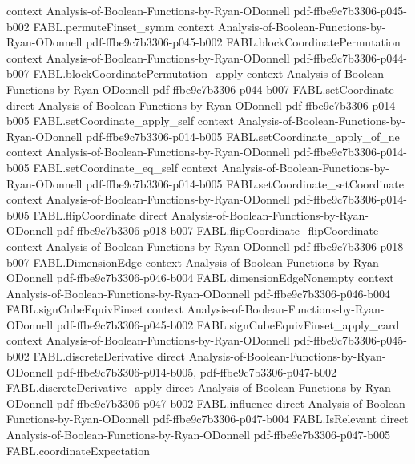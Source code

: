 \begin{theorem}
  {context}
  {Analysis-of-Boolean-Functions-by-Ryan-ODonnell}
  {pdf-ffbe9c7b3306-p045-b002}
\proofstep
  {FABL.permuteFinset_symm}
  {context}
  {Analysis-of-Boolean-Functions-by-Ryan-ODonnell}
  {pdf-ffbe9c7b3306-p045-b002}
\proofstep
  {FABL.blockCoordinatePermutation}
  {context}
  {Analysis-of-Boolean-Functions-by-Ryan-ODonnell}
  {pdf-ffbe9c7b3306-p044-b007}
\proofstep
  {FABL.blockCoordinatePermutation_apply}
  {context}
  {Analysis-of-Boolean-Functions-by-Ryan-ODonnell}
  {pdf-ffbe9c7b3306-p044-b007}
\proofstep
  {FABL.setCoordinate}
  {direct}
  {Analysis-of-Boolean-Functions-by-Ryan-ODonnell}
  {pdf-ffbe9c7b3306-p014-b005}
\proofstep
  {FABL.setCoordinate_apply_self}
  {context}
  {Analysis-of-Boolean-Functions-by-Ryan-ODonnell}
  {pdf-ffbe9c7b3306-p014-b005}
\proofstep
  {FABL.setCoordinate_apply_of_ne}
  {context}
  {Analysis-of-Boolean-Functions-by-Ryan-ODonnell}
  {pdf-ffbe9c7b3306-p014-b005}
\proofstep
  {FABL.setCoordinate_eq_self}
  {context}
  {Analysis-of-Boolean-Functions-by-Ryan-ODonnell}
  {pdf-ffbe9c7b3306-p014-b005}
\proofstep
  {FABL.setCoordinate_setCoordinate}
  {context}
  {Analysis-of-Boolean-Functions-by-Ryan-ODonnell}
  {pdf-ffbe9c7b3306-p014-b005}
\proofstep
  {FABL.flipCoordinate}
  {direct}
  {Analysis-of-Boolean-Functions-by-Ryan-ODonnell}
  {pdf-ffbe9c7b3306-p018-b007}
\proofstep
  {FABL.flipCoordinate_flipCoordinate}
  {context}
  {Analysis-of-Boolean-Functions-by-Ryan-ODonnell}
  {pdf-ffbe9c7b3306-p018-b007}
\proofstep
  {FABL.DimensionEdge}
  {context}
  {Analysis-of-Boolean-Functions-by-Ryan-ODonnell}
  {pdf-ffbe9c7b3306-p046-b004}
\proofstep
  {FABL.dimensionEdgeNonempty}
  {context}
  {Analysis-of-Boolean-Functions-by-Ryan-ODonnell}
  {pdf-ffbe9c7b3306-p046-b004}
\proofstep
  {FABL.signCubeEquivFinset}
  {context}
  {Analysis-of-Boolean-Functions-by-Ryan-ODonnell}
  {pdf-ffbe9c7b3306-p045-b002}
\proofstep
  {FABL.signCubeEquivFinset_apply_card}
  {context}
  {Analysis-of-Boolean-Functions-by-Ryan-ODonnell}
  {pdf-ffbe9c7b3306-p045-b002}
\proofstep
  {FABL.discreteDerivative}
  {direct}
  {Analysis-of-Boolean-Functions-by-Ryan-ODonnell}
  {pdf-ffbe9c7b3306-p014-b005,
    pdf-ffbe9c7b3306-p047-b002}
\proofstep
  {FABL.discreteDerivative_apply}
  {direct}
  {Analysis-of-Boolean-Functions-by-Ryan-ODonnell}
  {pdf-ffbe9c7b3306-p047-b002}
\proofstep
  {FABL.influence}
  {direct}
  {Analysis-of-Boolean-Functions-by-Ryan-ODonnell}
  {pdf-ffbe9c7b3306-p047-b004}
\proofstep
  {FABL.IsRelevant}
  {direct}
  {Analysis-of-Boolean-Functions-by-Ryan-ODonnell}
  {pdf-ffbe9c7b3306-p047-b005}
\proofstep
  {FABL.coordinateExpectation}

\end{theorem}
